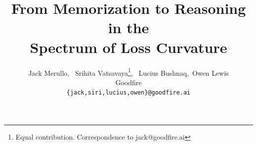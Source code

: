 \documentclass{article} %
\title{From Memorization to Reasoning in the \\Spectrum of Loss Curvature}
\author{Jack Merullo\footnotemark[1], \ Srihita Vatsavaya\thanks{Equal contribution. Correspondence to jack@goodfire.ai}, \ Lucius Bushnaq,\  Owen Lewis  \\
Goodfire\\
\texttt{\{jack,siri,lucius,owen\}@goodfire.ai}\\
}
\begin{document}
\maketitle

\begin{abstract}




\end{abstract}
\end{document}
